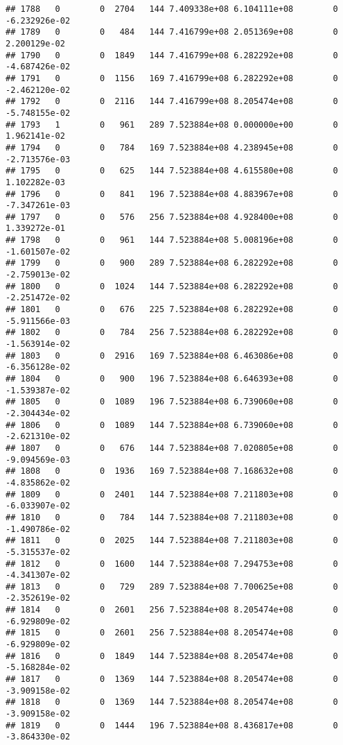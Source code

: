 \documentclass[
]{article}
\begin{document}
\begin{enumerate}
\begin{verbatim}
## 1788   0        0  2704   144 7.409338e+08 6.104111e+08        0 -6.232926e-02
## 1789   0        0   484   144 7.416799e+08 2.051369e+08        0  2.200129e-02
## 1790   0        0  1849   144 7.416799e+08 6.282292e+08        0 -4.687426e-02
## 1791   0        0  1156   169 7.416799e+08 6.282292e+08        0 -2.462120e-02
## 1792   0        0  2116   144 7.416799e+08 8.205474e+08        0 -5.748155e-02
## 1793   1        0   961   289 7.523884e+08 0.000000e+00        0  1.962141e-02
## 1794   0        0   784   169 7.523884e+08 4.238945e+08        0 -2.713576e-03
## 1795   0        0   625   144 7.523884e+08 4.615580e+08        0  1.102282e-03
## 1796   0        0   841   196 7.523884e+08 4.883967e+08        0 -7.347261e-03
## 1797   0        0   576   256 7.523884e+08 4.928400e+08        0  1.339272e-01
## 1798   0        0   961   144 7.523884e+08 5.008196e+08        0 -1.601507e-02
## 1799   0        0   900   289 7.523884e+08 6.282292e+08        0 -2.759013e-02
## 1800   0        0  1024   144 7.523884e+08 6.282292e+08        0 -2.251472e-02
## 1801   0        0   676   225 7.523884e+08 6.282292e+08        0 -5.911566e-03
## 1802   0        0   784   256 7.523884e+08 6.282292e+08        0 -1.563914e-02
## 1803   0        0  2916   169 7.523884e+08 6.463086e+08        0 -6.356128e-02
## 1804   0        0   900   196 7.523884e+08 6.646393e+08        0 -1.539387e-02
## 1805   0        0  1089   196 7.523884e+08 6.739060e+08        0 -2.304434e-02
## 1806   0        0  1089   144 7.523884e+08 6.739060e+08        0 -2.621310e-02
## 1807   0        0   676   144 7.523884e+08 7.020805e+08        0 -9.094569e-03
## 1808   0        0  1936   169 7.523884e+08 7.168632e+08        0 -4.835862e-02
## 1809   0        0  2401   144 7.523884e+08 7.211803e+08        0 -6.033907e-02
## 1810   0        0   784   144 7.523884e+08 7.211803e+08        0 -1.490786e-02
## 1811   0        0  2025   144 7.523884e+08 7.211803e+08        0 -5.315537e-02
## 1812   0        0  1600   144 7.523884e+08 7.294753e+08        0 -4.341307e-02
## 1813   0        0   729   289 7.523884e+08 7.700625e+08        0 -2.352619e-02
## 1814   0        0  2601   256 7.523884e+08 8.205474e+08        0 -6.929809e-02
## 1815   0        0  2601   256 7.523884e+08 8.205474e+08        0 -6.929809e-02
## 1816   0        0  1849   144 7.523884e+08 8.205474e+08        0 -5.168284e-02
## 1817   0        0  1369   144 7.523884e+08 8.205474e+08        0 -3.909158e-02
## 1818   0        0  1369   144 7.523884e+08 8.205474e+08        0 -3.909158e-02
## 1819   0        0  1444   196 7.523884e+08 8.436817e+08        0 -3.864330e-02

\end{verbatim}
\end{enumerate}
\end{document}

